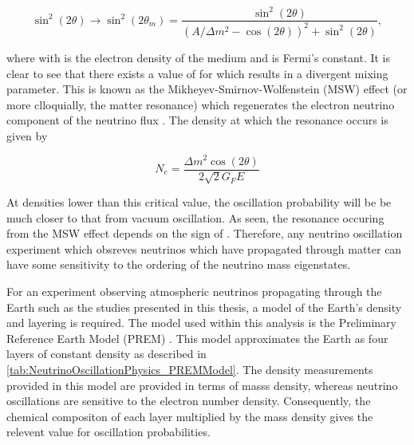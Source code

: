 \begin{equation}
  \label{eq:NeutrinoOscillationPhysics_2Flavour_MSW}
  \sin^{2}(2\theta) \rightarrow \sin^{2}(2\theta_{m}) = \frac{\sin^{2}(2\theta)}{(A/\Delta m^{2} - \cos(2\theta))^{2} + \sin^{2}(2\theta)},
\end{equation}

where  with  is the electron density of the medium and  is Fermi's constant. It is clear to see that there exists a value of  for  which results in a divergent mixing parameter. This is known as the Mikheyev-Smirnov-Wolfenstein (MSW) effect (or more clloquially, the matter resonance) which regenerates the electron neutrino component of the neutrino flux \cite{Smirnov2003-yb, msw, wolfenstein}. The density at which the resonance occurs is given by

\begin{equation}
  \label{eq:NeutrinoOscillationPhysics_ResonanceDensity}
  N_{e} = \frac{\Delta m^{2} \cos(2\theta)}{2\sqrt{2} G_{F} E}
\end{equation}

At densities lower than this critical value, the oscillation probability will be be much closer to that from vacuum oscillation. As seen, the resonance occuring from the MSW effect depends on the sign of . Therefore, any neutrino oscillation experiment which obsreves neutrinos which have propagated through matter can have some sensitivity to the ordering of the neutrino mass eigenstates.

For an experiment observing atmospheric neutrinos propagating through the Earth such as the studies presented in this thesis, a model of the Earth's density and layering is required. The model used within this analysis is the Preliminary Reference Earth Model (PREM) \cite{Dziewonski1981-sp}. This model approximates the Earth as four layers of constant density as described in \autoref{tab:NeutrinoOscillationPhysics_PREMModel}. The density measurements provided in this model are provided in terms of masss density, whereas neutrino oscillations are sensitive to the electron number density. Consequently, the chemical compositon of each layer multiplied by the mass density gives the relevent value for oscillation probabilities.

